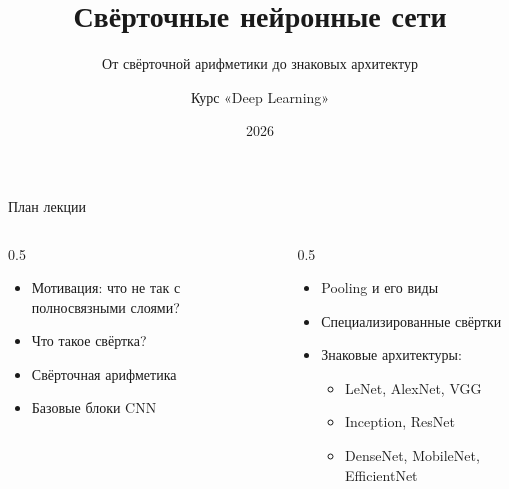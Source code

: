 \documentclass[aspectratio=169, 9pt]{beamer}
\title{Свёрточные нейронные сети}
\subtitle{От свёрточной арифметики до знаковых архитектур}
\author{Курс «Deep Learning»}
\date{2026}
\begin{document}
\begin{frame}
  \titlepage
\end{frame}

\begin{frame}{План лекции}
  \begin{columns}[T]
    \begin{column}{0.5\textwidth}
      \begin{itemize}
        \item Мотивация: что не так с полносвязными слоями?
        \item Что такое свёртка?
        \item Свёрточная арифметика
        \item Базовые блоки CNN
      \end{itemize}
    \end{column}
    \begin{column}{0.5\textwidth}
      \begin{itemize}
        \item Pooling и его виды
        \item Специализированные свёртки
        \item Знаковые архитектуры:
        \begin{itemize}
          \item LeNet, AlexNet, VGG
          \item Inception, ResNet
          \item DenseNet, MobileNet, EfficientNet
        \end{itemize}
      \end{itemize}
    \end{column}
  \end{columns}
\end{frame}
\end{document}
